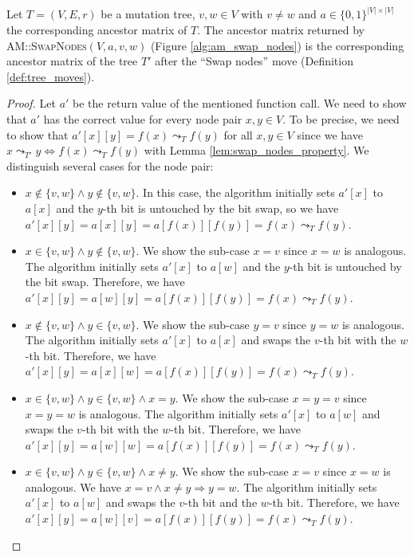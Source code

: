 \begin{theorem}
    \label{theo:swap_nodes_correctness}
    Let $T = (V, E, r)$ be a mutation tree, $v, w \in V$ with $v \neq w$ and $a \in \{0,1\}^{|V| \times |V|}$ the corresponding ancestor matrix of $T$. The ancestor matrix returned by \textsc{AM::SwapNodes}$(V, a, v, w)$ (Figure \ref{alg:am_swap_nodes}) is the corresponding ancestor matrix of the tree $T'$ after the ``Swap nodes'' move (Definition \ref{def:tree_moves}).
\end{theorem}

\begin{proof}
    Let $a'$ be the return value of the mentioned function call. We need to show that $a'$ has the correct value for every node pair $x, y \in V$. To be precise, we need to show that $a'[x][y] = f(x) \leadsto_T f(y)$ for all $x, y \in V$ since we have $x \leadsto_{T'} y \Leftrightarrow f(x) \leadsto_T f(y)$ with Lemma \ref{lem:swap_nodes_property}. We distinguish several cases for the node pair:
    \begin{itemize}
        \item $x \notin \{v, w\} \wedge y \notin \{v, w\}$. In this case, the algorithm initially sets $a'[x]$ to $a[x]$ and the $y$-th bit is untouched by the bit swap, so we have $a'[x][y] = a[x][y] = a[f(x)][f(y)] = f(x) \leadsto_T f(y)$.
        
        \item $x \in \{v, w\} \wedge y \notin \{v, w\}$. We show the sub-case $x = v$ since $x = w$ is analogous. The algorithm initially sets $a'[x]$ to $a[w]$ and the $y$-th bit is untouched by the bit swap. Therefore, we have $a'[x][y] = a[w][y] = a[f(x)][f(y)] = f(x) \leadsto_T f(y)$.
        
        \item $x \notin \{v, w\} \wedge y \in \{v, w\}$. We show the sub-case $y = v$ since $y = w$ is analogous. The algorithm initially sets $a'[x]$ to $a[x]$ and swaps the $v$-th bit with the $w$-th bit. Therefore, we have $a'[x][y] = a[x][w] = a[f(x)][f(y)] = f(x) \leadsto_T f(y)$.
        
        \item $x \in \{v, w\} \wedge y \in \{v, w\} \wedge x = y$. We show the sub-case $x = y = v$ since $x = y = w$ is analogous. The algorithm initially sets $a'[x]$ to $a[w]$ and swaps the $v$-th bit with the $w$-th bit. Therefore, we have $a'[x][y] = a[w][w] = a[f(x)][f(y)] = f(x) \leadsto_T f(y)$.
        
        \item $x \in \{v, w\} \wedge y \in \{v, w\} \wedge x \neq y$. We show the sub-case $x = v$ since $x = w$ is analogous. We have $x = v \wedge x \neq y \Rightarrow y = w$. The algorithm initially sets $a'[x]$ to $a[w]$ and swaps the $v$-th bit and the $w$-th bit. Therefore, we have $a'[x][y] = a[w][v] = a[f(x)][f(y)] = f(x) \leadsto_T f(y)$.
    \end{itemize}
\end{proof}

